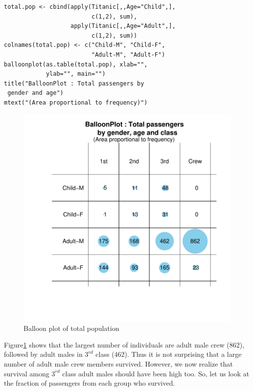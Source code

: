 \documentclass[a4paper]{report}
\begin{document}
\begin{article}
\vspace{-0.25in}

{\small
\begin{verbatim}
total.pop <- cbind(apply(Titanic[,,Age="Child",],
                         c(1,2), sum), 
                   apply(Titanic[,,Age="Adult",], 
                         c(1,2), sum))
colnames(total.pop) <- c("Child-M", "Child-F", 
                         "Adult-M", "Adult-F")
balloonplot(as.table(total.pop), xlab="",
            ylab="", main="")
title("BalloonPlot : Total passengers by
 gender and age")
mtext("(Area proportional to frequency)")
\end{verbatim}
 }


\begin{figure}
\includegraphics[width=\textwidth]{TotalPop.pdf}
\caption{\label{figure:Total.Pop}
Balloon plot of total population}
\end{figure}

Figure\ref{figure:Total.Pop} shows that the largest number of
individuals are adult male crew (862), followed by adult males in
$3^{rd}$ class (462).  Thus it is not surprising that a large number
of adult male crew members survived.  However, we now realize that
survival among $3^{rd}$ class adult males should have been high too.
So, let us look at the fraction of passengers from each group who
survived.


\end{article}
\end{document}
